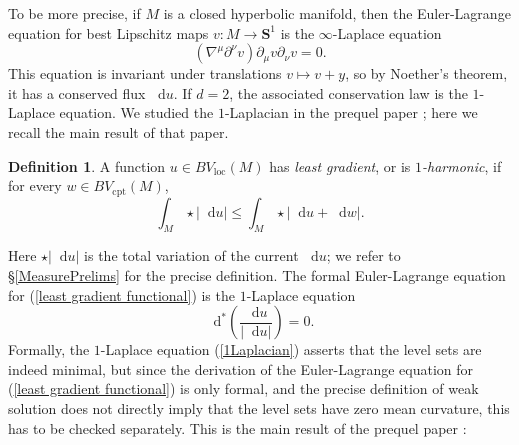 \documentclass[reqno,11pt]{amsart}
\newcommand{\Sph}{\mathbf S}
\newcommand*\dif{\mathop{}\!\mathrm{d}}
\newcommand{\dfn}[1]{\emph{#1}\index{#1}}
\newcommand{\loc}{\mathrm{loc}}
\newcommand{\cpt}{\mathrm{cpt}}
\theoremstyle{definition}
\newtheorem{definition}[theorem]{Definition}
\numberwithin{equation}{section}
\begin{document}
To be more precise, if $M$ is a closed hyperbolic manifold, then the Euler-Lagrange equation for best Lipschitz maps $v: M \to \Sph^1$ is the $\infty$-Laplace equation \cite{daskalopoulos2020transverse}
\begin{equation}\label{infinity laplacian}
(\nabla^\mu \partial^\nu v) \partial_\mu v \partial_\nu v = 0.
\end{equation}
This equation is invariant under translations $v \mapsto v + y$, so by Noether's theorem, it has a conserved flux $\dif u$.
If $d = 2$, the associated conservation law is the $1$-Laplace equation.
We studied the $1$-Laplacian in the prequel paper \cite{BackusFLG}; here we recall the main result of that paper.

\begin{definition}
A function $u \in BV_\loc(M)$ has \dfn{least gradient}, or is \dfn{$1$-harmonic}, if for every $w \in BV_\cpt(M)$,
\begin{equation}\label{least gradient functional}
\int_M \star |\dif u| \leq \int_M \star |\dif u + \dif w|.
\end{equation}
\end{definition}

Here $\star |\dif u|$ is the total variation of the current $\dif u$; we refer to \S\ref{MeasurePrelims} for the precise definition.
The formal Euler-Lagrange equation for (\ref{least gradient functional}) is the $1$-Laplace equation
\begin{equation}\label{1Laplacian}
\dif^* \left(\frac{\dif u}{|\dif u|}\right) = 0.
\end{equation}
Formally, the $1$-Laplace equation (\ref{1Laplacian}) asserts that the level sets are indeed minimal, but since the derivation of the Euler-Lagrange equation for (\ref{least gradient functional}) is only formal, and the precise definition of weak solution \cite{Mazon14} does not directly imply that the level sets have zero mean curvature, this has to be checked separately.
This is the main result of the prequel paper \cite{BackusFLG}:
\end{document}
